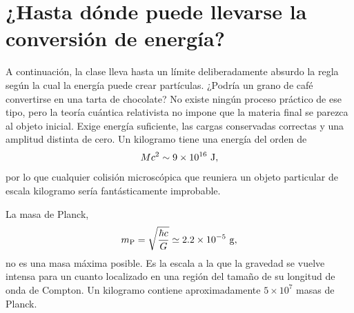\begin{classroomqa}
\end{classroomqa}

\section{¿Hasta dónde puede llevarse la conversión de energía?}

A continuación, la clase lleva hasta un límite deliberadamente absurdo la regla según la cual la energía puede crear partículas. ¿Podría un grano de café convertirse en una tarta de chocolate?
No existe ningún proceso práctico de ese tipo, pero la teoría cuántica relativista
no impone que la materia final se parezca al objeto inicial. Exige energía suficiente,
las cargas conservadas correctas y una amplitud distinta de cero. Un kilogramo tiene una energía del orden de
\begin{equation}
  Mc^2\sim9\times10^{16}\ {\rm J},
\end{equation}
por lo que cualquier colisión microscópica que reuniera un objeto particular de escala kilogramo sería fantásticamente improbable.

La masa de Planck,
\begin{equation}
  m_{\rm P}=\sqrt{\frac{\hbar c}{G}}
  \simeq2.2\times10^{-5}\ {\rm g},
\end{equation}
no es una masa máxima posible. Es la escala a la que la gravedad se vuelve
intensa para un cuanto localizado en una región del tamaño de su longitud de onda de Compton. Un kilogramo contiene
aproximadamente \(5\times10^7\) masas de Planck.

\begin{classroomqa}
\end{classroomqa}

